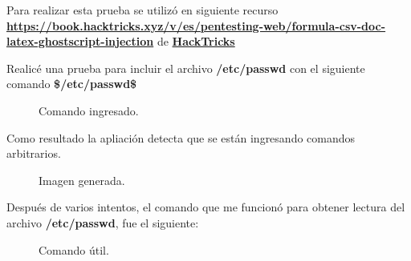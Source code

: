 \documentclass[a4paper]{article} %
\begin{document}
    Para realizar esta prueba se utilizó en siguiente recurso \href{https://book.hacktricks.xyz/v/es/pentesting-web/formula-csv-doc-latex-ghostscript-injection}{\textbf{\color{blue}https://book.hacktricks.xyz/v/es/pentesting-web/formula-csv-doc-latex-ghostscript-injection}} de \href{https://book.hacktricks.xyz}{\textbf{\color{red}HackTricks}}

    Realicé una prueba para incluir el archivo \textbf{/etc/passwd} con el siguiente comando \textbf{\$\texttt{\string}/etc/passwd\$}

    \begin{figure}[h] %
        \begin{center}
        \setlength{\fboxsep}{0.2em} %
        \end{center}
        \captionsetup{labelfont=bf} %
        \caption{Comando ingresado.}
    \end{figure}

    \vspace{5cm}

    Como resultado la apliación detecta que se están ingresando comandos arbitrarios.

    \begin{figure}[h] %
        \begin{center}
        \setlength{\fboxsep}{0.2em} %
        \end{center}
        \captionsetup{labelfont=bf} %
        \caption{Imagen generada.}
    \end{figure}

    \vspace{14cm}

    Después de varios intentos, el comando que me funcionó para obtener lectura del archivo \textbf{/etc/passwd}, fue el siguiente:

    \begin{figure}[h] %
        \begin{center}
        \setlength{\fboxsep}{0.2em} %
        \end{center}
        \captionsetup{labelfont=bf} %
        \caption{Comando útil.}
    \end{figure}
\end{document}
